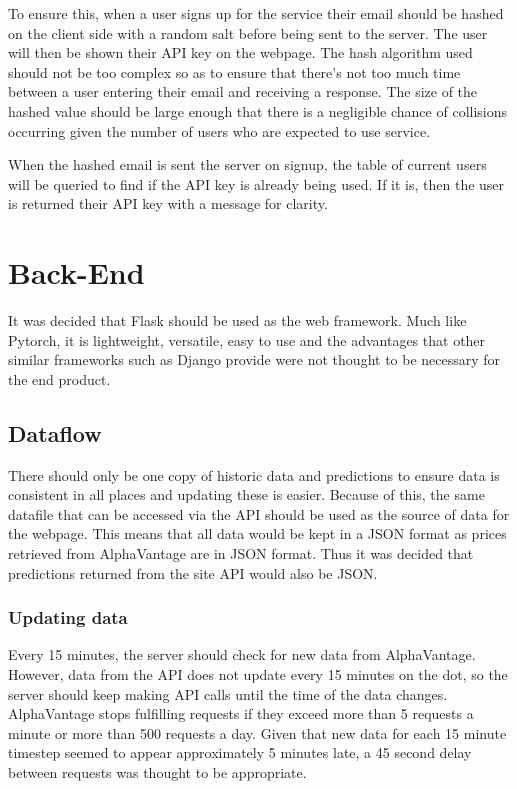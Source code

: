         To ensure this, when a user signs up for the service their email should be hashed on the client side with a random salt before being sent to the server. The user will then be shown their API key on the webpage. The hash algorithm used should not be too complex so as to ensure that there's not too much time between a user entering their email and receiving a response. The size of the hashed value should be large enough that there is a negligible chance of collisions occurring given the number of users who are expected to use service.

        When the hashed email is sent the server on signup, the table of current users will be queried to find if the API key is already being used. If it is, then the user is returned their API key with a message for clarity. 
    
    \section{Back-End}

        It was decided that Flask should be used as the web framework. Much like Pytorch, it is lightweight, versatile, easy to use and the advantages that other similar frameworks such as Django provide were not thought to be necessary for the end product.

        \subsection{Dataflow}
        There should only be one copy of historic data and predictions to ensure data is consistent in all places and updating these is easier. Because of this, the same datafile that can be accessed via the API should be used as the source of data for the webpage. This means that all data would be kept in a JSON format as prices retrieved from AlphaVantage are in JSON format. Thus it was decided that predictions returned from the site API would also be JSON.
            
            \subsubsection{Updating data}
            Every 15 minutes, the server should check for new data from AlphaVantage. However, data from the API does not update every 15 minutes on the dot, so the server should keep making API calls until the time of the data changes. AlphaVantage stops fulfilling requests if they exceed more than 5 requests a minute or more than 500 requests a day. Given that new data for each 15 minute timestep seemed to appear approximately 5 minutes late, a 45 second delay between requests was thought to be appropriate.

